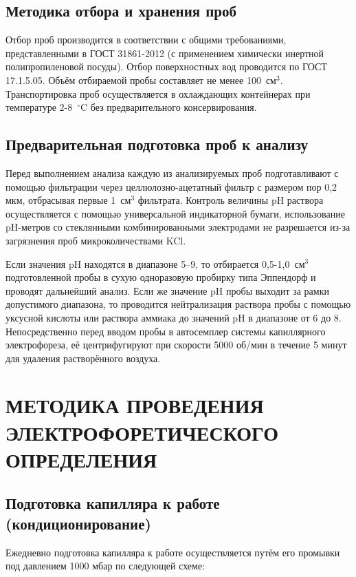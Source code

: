 \subsection{Методика отбора и хранения проб}

Отбор проб производится в соответствии с общими требованиями, представленными в ГОСТ 31861-2012 (с применением химически инертной полипропиленовой посуды). Отбор поверхностных вод проводится по ГОСТ 17.1.5.05. Объём отбираемой пробы составляет не менее 100~см$^3$. Транспортировка проб осуществляется в охлаждающих контейнерах при температуре 2-8~$^\circ$C без предварительного консервирования.

\subsection{Предварительная подготовка проб к анализу}

Перед выполнением анализа каждую из анализируемых проб подготавливают с помощью фильтрации через целлюлозно-ацетатный фильтр с размером пор 0,2 мкм, отбрасывая первые 1~см$^3$ фильтрата. Контроль величины pH раствора осуществляется с помощью универсальной индикаторной бумаги, использование pH-метров со стеклянными комбинированными электродами не разрешается из-за загрязнения проб микроколичествами KCl.

Если значения pH находятся в диапазоне 5–9, то отбирается 0,5-1,0~см$^3$ подготовленной пробы в сухую одноразовую пробирку типа Эппендорф и проводят дальнейший анализ. Если же значение pH пробы выходит за рамки допустимого диапазона, то проводится нейтрализация раствора пробы с помощью уксусной кислоты или раствора аммиака до значений pH в диапазоне от 6 до 8. Непосредственно перед вводом пробы в автосемплер системы капиллярного электрофореза, её центрифугируют при скорости 5000 об/мин в течение 5 минут для удаления растворённого воздуха.

\section{МЕТОДИКА ПРОВЕДЕНИЯ ЭЛЕКТРОФОРЕТИЧЕСКОГО ОПРЕДЕЛЕНИЯ}

\subsection{Подготовка капилляра к работе (кондиционирование)}

Ежедневно подготовка капилляра к работе осуществляется путём его промывки под давлением 1000 мбар по следующей схеме:


